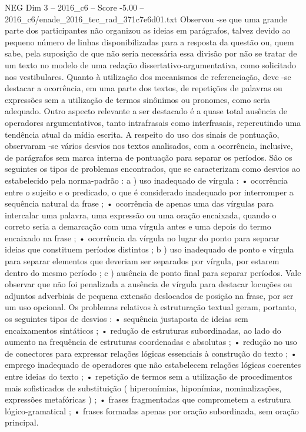 \begin{textsample}{NEG Dim 3 – 2016\_c6 – Score -5.00 – 2016\_c6/enade\_2016\_tec\_rad\_371c7e6d01.txt}
Observou -se que uma grande parte dos participantes não organizou as ideias em parágrafos, talvez devido ao pequeno número de linhas disponibilizadas para a resposta da questão ou, quem sabe, pela suposição de que não seria necessária essa divisão por não se tratar de um texto no modelo de uma redação dissertativo-argumentativa, como solicitado nos vestibulares.
Quanto à utilização dos mecanismos de referenciação, deve -se destacar a ocorrência, em uma parte dos textos, de repetições de palavras ou expressões sem a utilização de termos sinônimos ou pronomes, como seria adequado.
Outro aspecto relevante a ser destacado é a quase total ausência de operadores argumentativos, tanto intrafrasais como interfrasais, repercutindo uma tendência atual da mídia escrita.
A respeito do uso dos sinais de pontuação, observaram -se vários desvios nos textos analisados, com a ocorrência, inclusive, de parágrafos sem marca interna de pontuação para separar os períodos.
São os seguintes os tipos de problemas encontrados, que se caracterizam como desvios ao estabelecido pela norma-padrão : a ) uso inadequado de vírgula : • ocorrência entre o sujeito e o predicado, o que é considerado inadequado por interromper a sequência natural da frase ; • ocorrência de apenas uma das vírgulas para intercalar uma palavra, uma expressão ou uma oração encaixada, quando o correto seria a demarcação com uma vírgula antes e uma depois do termo encaixado na frase ; • ocorrência da vírgula no lugar do ponto para separar ideias que constituem períodos distintos ; b ) uso inadequado de ponto e vírgula para separar elementos que deveriam ser separados por vírgula, por estarem dentro do mesmo período ; c ) ausência de ponto final para separar períodos.
Vale observar que não foi penalizada a ausência de vírgula para destacar locuções ou adjuntos adverbiais de pequena extensão deslocados de posição na frase, por ser um uso opcional.
Os problemas relativos à estruturação textual geram, portanto, os seguintes tipos de desvios : • sequência justaposta de ideias sem encaixamentos sintáticos ; • redução de estruturas subordinadas, ao lado do aumento na frequência de estruturas coordenadas e absolutas ; • redução no uso de conectores para expressar relações lógicas essenciais à construção do texto ; • emprego inadequado de operadores que não estabelecem relações lógicas coerentes entre ideias do texto ; • repetição de termos sem a utilização de procedimentos mais sofisticados de substituição ( hiperonímias, hiponímias, nominalizações, expressões metafóricas ) ; • frases fragmentadas que comprometem a estrutura lógico-gramatical ; • frases formadas apenas por oração subordinada, sem oração principal.

\end{textsample}
